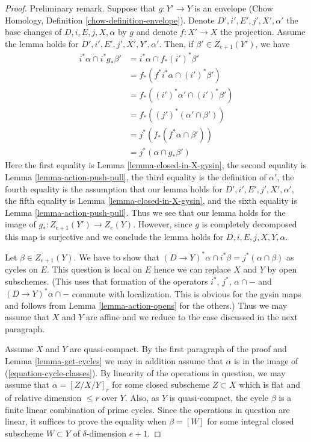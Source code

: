 \begin{proof}
Preliminary remark.
Suppose that $g : Y' \to Y$ is an envelope (Chow Homology, Definition
\ref{chow-definition-envelope}).
Denote $D', i', E', j', X', \alpha'$ the base changes of
$D, i, E, j, X, \alpha$ by $g$ and denote $f : X' \to X$ the projection.
Assume the lemma holds for $D', i', E', j', X', Y', \alpha'$.
Then, if $\beta' \in Z_{e + 1}(Y')$, we have
\begin{align*}
i^*\alpha \cap i^*g_*\beta'
& =
i^*\alpha \cap f_*(i')^*\beta' \\
& =
f_*(f^*i^*\alpha \cap (i')^*\beta') \\
& =
f_*((i')^*\alpha' \cap (i')^*\beta') \\
& =
f_*((j')^*(\alpha' \cap \beta')) \\
& =
j^*(f_*(f^*\alpha \cap \beta')) \\
& =
j^*(\alpha \cap g_*\beta')
\end{align*}
Here the
first equality is Lemma \ref{lemma-closed-in-X-gysin},
the second equality is Lemma \ref{lemma-action-push-pull},
the third equality is the definition of $\alpha'$,
the fourth equality is the assumption that our lemma holds for
$D', i', E', j', X', \alpha'$,
the fifth equality is Lemma \ref{lemma-closed-in-X-gysin}, and
the sixth equality is Lemma \ref{lemma-action-push-pull}.
Thus we see that our lemma holds for the image of
$g_* : Z_{e + 1}(Y') \to Z_e(Y)$. However, since $g$ is completely
decomposed this map is surjective and we conclude the lemma holds
for $D, i, E, j, X, Y, \alpha$.

\medskip\noindent
Let $\beta \in Z_{e + 1}(Y)$. We have to show that
$(D \to Y)^*\alpha \cap i^*\beta = j^*(\alpha \cap \beta)$
as cycles on $E$. This question is local on $E$ hence we
can replace $X$ and $Y$ by open subschemes. (This uses that formation
of the operators $i^*$, $j^*$, $\alpha \cap - $ and
$(D \to Y)^*\alpha \cap -$ commute with localization. This is
obvious for the gysin maps and follows from
Lemma \ref{lemma-action-opens} for the others.)
Thus we may assume that $X$ and $Y$ are affine
and we reduce to the case discussed in the next paragraph.

\medskip\noindent
Assume $X$ and $Y$ are quasi-compact. By the first paragraph of the proof
and Lemma \ref{lemma-get-cycles} we may in addition assume that $\alpha$
is in the image of (\ref{equation-cycle-classes}). By linearity
of the operations in question, we may assume that $\alpha = [Z/X/Y]_r$
for some closed subscheme $Z \subset X$ which is flat and of relative
dimension $\leq r$ over $Y$. Also, as $Y$ is quasi-compact, the cycle
$\beta$ is a finite linear combination of prime cycles. Since the operations
in question are linear, it suffices
to prove the equality when $\beta = [W]$ for some integral closed subscheme
$W \subset Y$ of $\delta$-dimension $e + 1$.


\end{proof}

